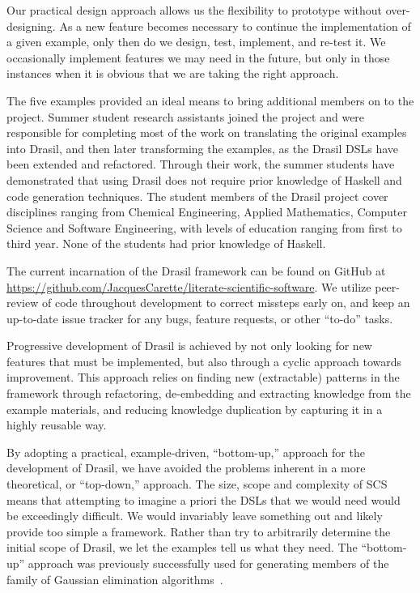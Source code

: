 \documentclass[sigconf]{acmart}
\begin{document}
Our practical design approach allows us the flexibility to prototype without 
over-designing. As a new feature becomes necessary to continue the 
implementation of a given example, only then do we design, test, implement, and 
re-test it. We occasionally implement features we may need in the future, but 
only in those instances when it is obvious that we are taking the right 
approach.

The five examples provided an ideal means to bring additional members on to the
project.  Summer student research assistants joined the project and were
responsible for completing most of the work on translating the original examples
into Drasil, and then later transforming the examples, as the Drasil DSLs have
been extended and refactored.  Through their work, the summer students have
demonstrated that using Drasil does not require prior knowledge of Haskell and
code generation techniques.  The student members of the Drasil project cover
disciplines ranging from Chemical Engineering, Applied Mathematics, Computer
Science and Software Engineering, with levels of education ranging from first to
third year. None of the students had prior knowledge of Haskell.

The current incarnation of the Drasil framework can be found on GitHub at 
\href{https://github.com/JacquesCarette/literate-scientific-software}
{https://github.com/JacquesCarette/literate-scientific-software}. We utilize 
peer-review of code throughout development to correct missteps early on, and 
keep an up-to-date issue tracker for any bugs, feature requests, or other 
``to-do'' tasks.

Progressive development of Drasil is achieved by not only looking for new 
features that must be implemented, but also through a cyclic approach towards 
improvement. This approach relies on finding new (extractable) patterns in the 
framework through refactoring, de-embedding and extracting knowledge from the 
example materials, and reducing knowledge duplication by capturing it in a 
highly reusable way.

By adopting a practical, example-driven, ``bottom-up,'' approach for the
development of Drasil, we have avoided the problems inherent in a more
theoretical, or ``top-down,'' approach.  The size, scope and complexity of SCS
means that attempting to imagine a priori the DSLs that we would need would be
exceedingly difficult.  We would invariably leave something out and likely
provide too simple a framework.  Rather than try to arbitrarily determine the
initial scope of Drasil, we let the examples tell us what they need. The
``bottom-up'' approach was previously successfully used for generating members
of the family of Gaussian elimination algorithms~\cite{Carette2006}.  
\end{document}
